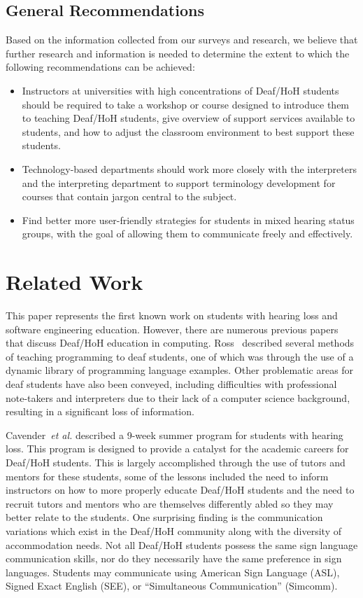 \documentclass[conference]{IEEEtran}
\begin{document}
\subsection{General Recommendations}
Based on the information collected from our surveys and research, we believe that further research and information is needed to determine the extent to which the following recommendations can be achieved:
\begin{itemize}
\item Instructors at universities with high concentrations of Deaf/HoH students should be required to take a workshop or course designed to introduce them to teaching Deaf/HoH students, give overview of support services available to students, and how to adjust the classroom environment to best support these students.
\item Technology-based departments should work more closely with the interpreters and the interpreting department to support terminology development for courses that contain jargon central to the subject.
\item Find better more user-friendly strategies for students in mixed hearing status groups, with the goal of allowing them to communicate freely and effectively.
 \end{itemize}

\section{Related Work}
\label{sec: relatedwork}

This paper represents the first known work on students with hearing loss and software engineering education. However, there are numerous previous papers that discuss Deaf/HoH education in computing. Ross~\cite{Ross:1982:TPD:964167.964174} described several methods of teaching programming to deaf students, one of which was through the use of a dynamic library of programming language examples. Other problematic areas for deaf students have also been conveyed, including difficulties with professional note-takers and interpreters due to their lack of a computer science background, resulting in a significant loss of information.

Cavender~\emph{et al.}\cite{Cavender:2009:SAA:1508865.1509043} described a 9-week summer program for students with hearing loss. This program is designed to provide a catalyst for the academic careers for Deaf/HoH students. This is largely accomplished through the use of tutors and mentors for these students, some of the lessons included the need to inform instructors on how to more properly educate Deaf/HoH students and the need to recruit tutors and mentors who are themselves differently abled so they may better relate to the students. One surprising finding is the communication variations which exist in the Deaf/HoH community along with the diversity of accommodation needs. Not all Deaf/HoH students possess the same sign language communication skills, nor do they necessarily have the same preference in sign languages. Students may communicate using American Sign Language (ASL), Signed Exact English (SEE), or ``Simultaneous Communication'' (Simcomm).
\end{document}
